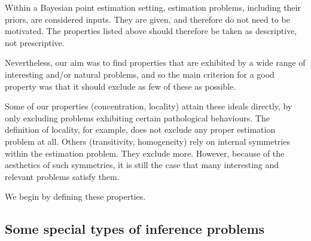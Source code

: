 \documentclass{IEEEtran}
\begin{document}
Within a Bayesian point estimation setting, estimation problems, including
their priors, are considered inputs. They are given, and therefore do not
need to be motivated. The properties listed above should therefore be taken
as descriptive, not prescriptive.

Nevertheless, our aim was to find properties that are exhibited by a wide
range of interesting and/or natural problems, and so the main criterion for
a good property was that it should exclude as few of these as possible.

Some of our properties (concentration, locality) attain these ideals directly,
by only excluding problems exhibiting certain pathological behaviours.
The definition of locality, for example, does not exclude any proper
estimation problem at all. Others (transitivity, homogeneity) rely on internal
symmetries within the estimation problem. They exclude more. However, because
of the aesthetics of such symmetries, it is still the case that many interesting
and relevant problems satisfy them.

We begin by defining these properties.




\subsection{Some special types of inference problems}\label{SS:types}
\end{document}
